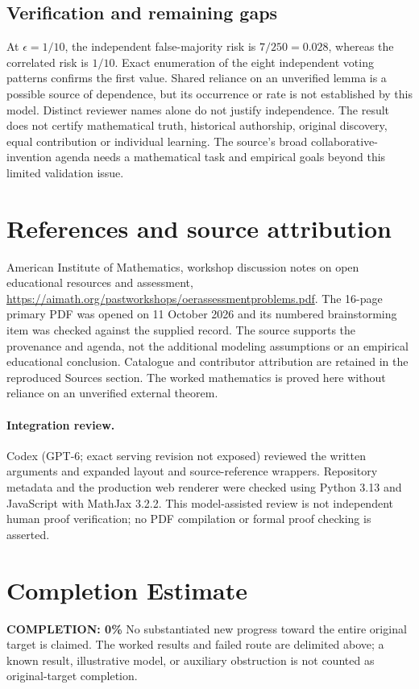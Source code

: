\documentclass[11pt]{article}
\begin{document}
\subsection{Verification and remaining gaps}
At $\epsilon=1/10$, the independent false-majority risk is $7/250=0.028$, whereas the correlated risk is $1/10$. Exact enumeration of the eight independent voting patterns confirms the first value. Shared reliance on an unverified lemma is a possible source of dependence, but its occurrence or rate is not established by this model. Distinct reviewer names alone do not justify independence. The result does not certify mathematical truth, historical authorship, original discovery, equal contribution or individual learning. The source's broad collaborative-invention agenda needs a mathematical task and empirical goals beyond this limited validation issue.

\section{References and source attribution}
American Institute of Mathematics, workshop discussion notes on open educational resources and assessment, \url{https://aimath.org/pastworkshops/oerassessmentproblems.pdf}. The 16-page primary PDF was opened on 11 October 2026 and its numbered brainstorming item was checked against the supplied record. The source supports the provenance and agenda, not the additional modeling assumptions or an empirical educational conclusion. Catalogue and contributor attribution are retained in the reproduced Sources section. The worked mathematics is proved here without reliance on an unverified external theorem.


\paragraph{Integration review.} Codex (GPT-6; exact serving revision not exposed) reviewed the written arguments and expanded layout and source-reference wrappers. Repository metadata and the production web renderer were checked using Python 3.13 and JavaScript with MathJax 3.2.2. This model-assisted review is not independent human proof verification; no PDF compilation or formal proof checking is asserted.

\section{Completion Estimate}
\noindent\textbf{COMPLETION: 0\%}
No substantiated new progress toward the entire original target is claimed. The worked results and failed route are delimited above; a known result, illustrative model, or auxiliary obstruction is not counted as original-target completion.
\end{document}
